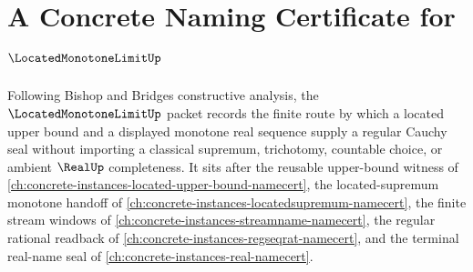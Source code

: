 \chapter{A Concrete Naming Certificate for $\LocatedMonotoneLimitUp$}
\label{ch:concrete-instances-located-monotone-limit-namecert}

Following Bishop and Bridges constructive analysis, the $\LocatedMonotoneLimitUp$ packet records the finite route by which a located upper bound and a displayed monotone real sequence supply a regular Cauchy seal without importing a classical supremum, trichotomy, countable choice, or ambient $\RealUp$ completeness. It sits after the reusable upper-bound witness of \autoref{ch:concrete-instances-located-upper-bound-namecert}, the located-supremum monotone handoff of \autoref{ch:concrete-instances-locatedsupremum-namecert}, the finite stream windows of \autoref{ch:concrete-instances-streamname-namecert}, the regular rational readback of \autoref{ch:concrete-instances-regseqrat-namecert}, and the terminal real-name seal of \autoref{ch:concrete-instances-real-namecert}.

